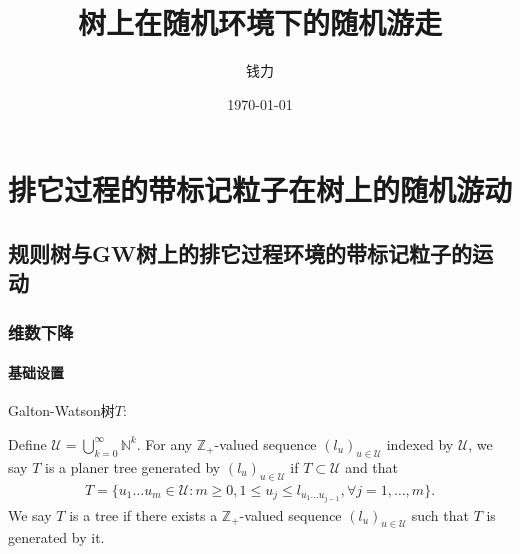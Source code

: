 \documentclass[a4paper,oneside]{ctexbook}
\begin{document}
\title{ \Huge \textbf{树上在随机环境下的随机游走} }
	
\vspace{4em}

\author{钱力}

\date{\today}

\maketitle
\thispagestyle{empty}





 



\cleardoublepage
{}
{}
\tableofcontents
\cleardoublepage

\newtheorem{thm}{定理}[chapter]
\newtheorem{que}[thm]{问题}
\newtheorem{pro}[thm]{命题}
\newtheorem{cor}[thm]{推论}
\newtheorem{defi}[thm]{定义}
\newtheorem{lem}[thm]{引理}
\newtheorem{conjec}[thm]{猜想}
\newtheorem{tri}[thm]{尝试}
\newtheorem{pf}[thm]{证明}
\newtheorem{iss}{Issue}

\chapter{排它过程的带标记粒子在树上的随机游动}

\section{规则树与GW树上的排它过程环境的带标记粒子的运动}

	


	
	\subsection{维数下降}

		\subsubsection*{基础设置}

			Galton-Watson树$T$:

			Define $\mathcal U = \bigcup_{k=0}^\infty \mathbb N^{k}$.
			For any  $\mathbb Z_+$-valued sequence $(l_u)_{u \in \mathcal U}$ indexed by $\mathcal U$, we say $T$ is a planer tree generated by $(l_u)_{u \in \mathcal U}$ if $T \subset \mathcal U$ and that
			\begin{align}
			T 
			= \{ u_1\dots u_m \in \mathcal U: m \geq 0, 1 \le u_j \leq l_{u_1 \dots u_{j-1}}, \forall j = 1,\dots, m\}.
			\end{align}
			We say $T$ is a tree if there exists a $\mathbb Z_+$-valued sequence $(l_u)_{u \in \mathcal U}$ such that $T$ is generated by it.
\end{document}
